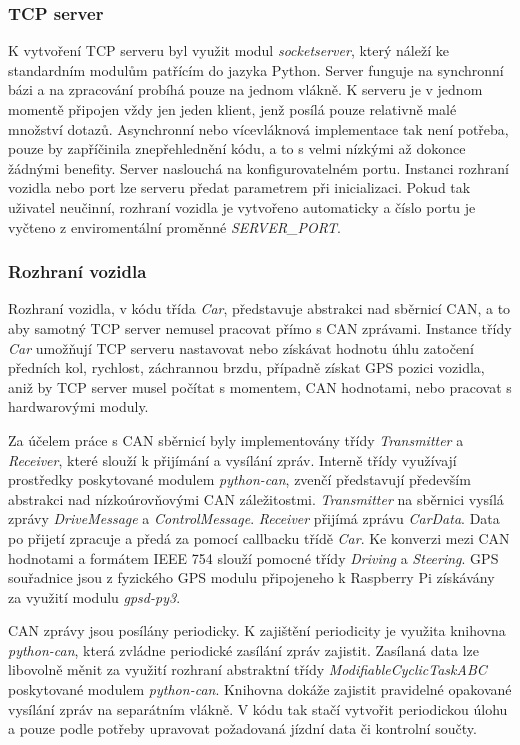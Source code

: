 \documentclass[czech,bachelor,dept460,male,cpp,cpdeclaration]{diploma}
\begin{document}
\subsubsection{TCP server}
K vytvoření TCP serveru byl využit modul \emph{socketserver}, který náleží ke standardním modulům patřícím do jazyka Python.
Server funguje na synchronní bázi a na zpracování probíhá pouze na jednom vlákně. K serveru je v jednom momentě připojen vždy jen
jeden klient, jenž posílá pouze relativně malé množství dotazů. Asynchronní nebo vícevláknová implementace tak není potřeba, 
pouze by zapříčinila znepřehlednění kódu, a to s velmi nízkými až dokonce žádnými benefity. Server naslouchá na konfigurovatelném
portu. Instanci rozhraní vozidla nebo port lze serveru předat parametrem při inicializaci. Pokud tak uživatel neučinní, rozhraní
vozidla je vytvořeno automaticky a číslo portu je vyčteno z enviromentální proměnné \emph{SERVER\_PORT}.

\subsubsection{Rozhraní vozidla}
Rozhraní vozidla, v kódu třída \emph{Car}, představuje abstrakci nad sběrnicí CAN, a to aby samotný TCP server nemusel pracovat
přímo s CAN zprávami. Instance třídy \emph{Car} umožňují TCP serveru nastavovat nebo získávat hodnotu úhlu zatočení předních kol,
rychlost, záchrannou brzdu, případně získat GPS pozici vozidla, aniž by TCP server musel počítat s momentem, CAN hodnotami, nebo
pracovat s hardwarovými moduly.

Za účelem práce s CAN sběrnicí byly implementovány třídy \emph{Transmitter} a \emph{Receiver}, které slouží k přijímání a vysílání
zpráv. Interně třídy využívají prostředky poskytované modulem \emph{python-can}, zvenčí představují především abstrakci 
nad nízkoúrovňovými CAN záležitostmi. \emph{Transmitter} na sběrnici vysílá zprávy \emph{DriveMessage} a \emph{ControlMessage}.
\emph{Receiver} přijímá zprávu \emph{CarData}. Data po přijetí zpracuje a předá za pomocí callbacku třídě \emph{Car}. Ke konverzi
mezi CAN hodnotami a formátem IEEE 754 slouží pomocné třídy \emph{Driving} a \emph{Steering}. GPS souřadnice jsou z fyzického GPS
modulu připojeneho k Raspberry Pi získávány za využití modulu \emph{gpsd-py3}.

CAN zprávy jsou posílány periodicky. K zajištění periodicity je využita knihovna \emph{python-can}, která zvládne periodické
zasílání zpráv zajistit. Zasílaná data lze libovolně měnit za využití rozhraní abstraktní třídy \emph{ModifiableCyclicTaskABC} 
poskytované modulem \emph{python-can}. Knihovna dokáže zajistit pravidelné opakované vysílání zpráv na separátním vlákně. V kódu
tak stačí vytvořit periodickou úlohu a pouze podle potřeby upravovat požadovaná jízdní data či kontrolní součty.
\end{document}
